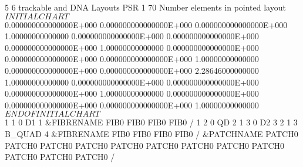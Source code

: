 \begin{ptccode}
           5           6  trackable and DNA Layouts \label{lin:mt:1}
PSR 1           											\label{lin:mt:psr1}                                                                                                       
          70  Number elements in pointed layout                                       \label{lin:mt:first}   
  $$$$$$$$$$$$$$$$$ INITIAL CHART $$$$$$$$$$$$$$$$$  \label{lin:mt:chart1}   
  0.000000000000000E+000  0.000000000000000E+000  0.000000000000000E+000
   1.00000000000000       0.000000000000000E+000  0.000000000000000E+000
  0.000000000000000E+000   1.00000000000000       0.000000000000000E+000
  0.000000000000000E+000  0.000000000000000E+000   1.00000000000000     
  0.000000000000000E+000  0.000000000000000E+000   2.28646000000000     
   1.00000000000000       0.000000000000000E+000  0.000000000000000E+000
  0.000000000000000E+000   1.00000000000000       0.000000000000000E+000
  0.000000000000000E+000  0.000000000000000E+000   1.00000000000000     
  $$$$$$$$$$$$$$$$$ END OF INITIAL CHART $$$$$$$$$$$$$$$$$ \label{lin:mt:chart2}   
    1        1  0 D1                              1             \label{lin:mt:firstf}            
 &FIBRENAME
 FIB0%
 FIB0%
 FIB0%
 FIB0%
 /
    1        2  0 QD                              2  \label{lin:mt:2}    
    1        3  0 D2                              3  \label{lin:mt:3} 
    2        1  3 B_QUAD                          4   \label{lin:mt:4}                 
 &FIBRENAME
 FIB0%
 FIB0%
 FIB0%
 FIB0%
 /
 &PATCHNAME
 PATCH0%
 PATCH0%
 PATCH0%
 PATCH0%
 PATCH0%
 PATCH0%
 PATCH0%
 PATCH0%
 PATCH0%
 PATCH0%
 PATCH0%
 PATCH0%
 /
\end{ptccode}

